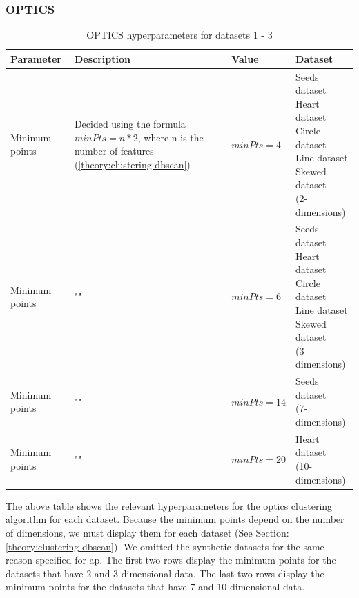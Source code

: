 \subsubsection{OPTICS}

\begin{table}[h]
      \begin{tabular}{|l|p{6cm}|l|l|}
            \hline
            Parameter      & Description                                                                                                    & Value       & Dataset                    \\
            \hline
            Minimum points & Decided using the formula $minPts = n * 2$, where n is the number of features (\ref{theory:clustering-dbscan}) & $minPts=4$  & \makecell[l]{Seeds dataset \\ Heart dataset \\ Circle dataset \\ Line dataset \\ Skewed dataset \\ (2-dimensions)}  \\
            \hline
            Minimum points & ""                                                                                                             & $minPts=6$  & \makecell[l]{Seeds dataset \\ Heart dataset \\ Circle dataset \\ Line dataset \\ Skewed dataset \\ (3-dimensions)} \\
            \hline
            Minimum points & ""                                                                                                             & $minPts=14$ & \makecell[l]{Seeds dataset \\ (7-dimensions)}  \\
            \hline
            Minimum points & ""                                                                                                             & $minPts=20$ & \makecell[l]{Heart dataset \\ (10-dimensions)} \\
            \hline
      \end{tabular}
      \caption{OPTICS  hyperparameters for datasets 1 - 3}
      \label{tab:dbscan-formula-sklearn}
\end{table}
The above table shows the relevant hyperparameters for the \gls{optics} clustering algorithm for each dataset.
Because the minimum points depend on the number of dimensions, we must display them for each dataset (See Section: \ref{theory:clustering-dbscan}).
We omitted the synthetic datasets for the same reason specified for \gls{ap}.
The first two rows display the minimum points for the datasets that have 2 and 3-dimensional data.
The last two rows display the minimum points for the datasets that have 7 and 10-dimensional data.
\newpage
